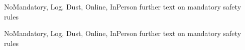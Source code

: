 \documentclass[11pt, oneside]{book}
\begin{document}
        {NoMandatory, Log, Dust, Online, InPerson}%
        {further text on mandatory safety rules}
        {%
        }
        {%
}  


        {NoMandatory, Log, Dust, Online, InPerson}%
        {further text on mandatory safety rules}
        {%
        }
        {%
}  
\end{document}
